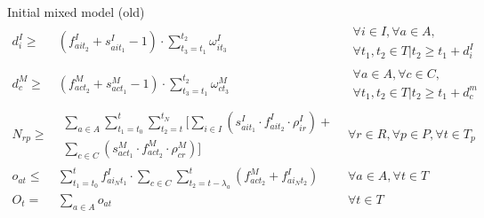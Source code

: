 \documentclass{beamer}
\begin{document}
\begin{frame}{Initial mixed model (old)}
{\begin{align}
d^I_i \geq& (f^I_{ait_2} + s^I_{ait_1} - 1) \cdot \sum_{t_3 = t_1}^{t_2} \omega^I_{it_3} 			& 	\begin{aligned} \forall i \in I, \forall a \in A, \\
																	\forall t_1, t_2 \in T | t_2 \geq t_1 + d^I_i \end{aligned}\\
d^M_c \geq& (f^M_{act_2} + s^M_{act_1} - 1) \cdot \sum_{t_3 = t_1}^{t_2} \omega^M_{ct_3} 			& 	\begin{aligned} \forall a \in A, \forall c \in C, \\
																	\forall t_1, t_2 \in T | t_2 \geq t_1 + d^m_c \end{aligned}\\
N_{rp} \geq& \begin{aligned}\sum_{a\in A} \sum_{t_1 = t_0}^t \sum_{t_2 = t}^{t_N} [ \sum_{i\in I} (s^I_{ait_1} \cdot f^I_{ait_2} \cdot \rho_{ir}^I) + \\ \sum_{c\in C} (s^M_{act_1} \cdot f^M_{act_2} \cdot \rho_{cr}^M) ] \end{aligned}	& 	\forall r \in R, \forall p \in P, \forall t \in T_p 	\\
o_{at} \leq& \sum_{t_1 = t_0}^{t} f^I_{ai_Nt_1} \cdot \sum_{c \in C} \sum_{t_2 = t - \lambda_a}^t (f^M_{act_2} + f^I_{ai_Nt_2})	&	\forall a \in A, \forall t \in T \\
O_t =& \sum_{a \in A} o_{at}													&	\forall t \in T
\end{align} }

\end{frame}
\end{document}
